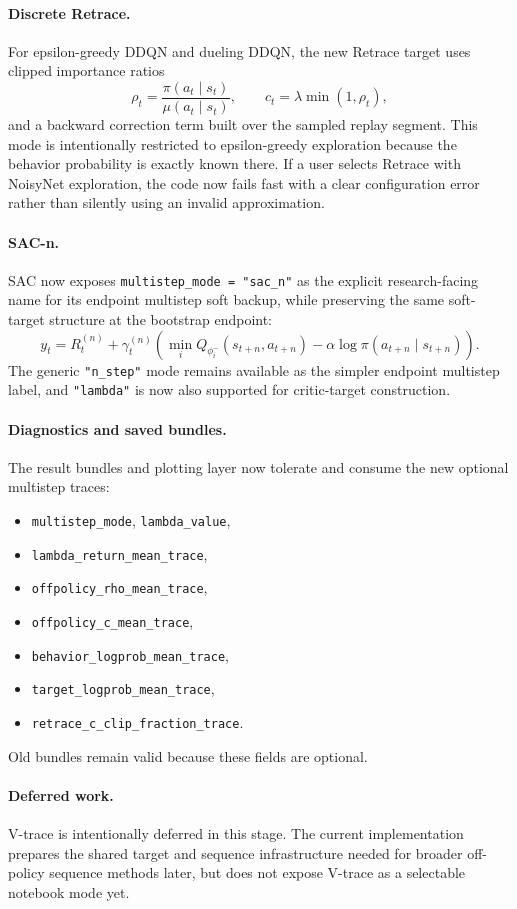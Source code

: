 \paragraph{Discrete Retrace.}
For epsilon-greedy DDQN and dueling DDQN, the new Retrace target uses clipped importance ratios
\[
\rho_t = \frac{\pi(a_t \mid s_t)}{\mu(a_t \mid s_t)},
\qquad
c_t = \lambda \min(1,\rho_t),
\]
and a backward correction term built over the sampled replay segment. This mode is intentionally restricted to epsilon-greedy exploration because the behavior probability is exactly known there. If a user selects Retrace with NoisyNet exploration, the code now fails fast with a clear configuration error rather than silently using an invalid approximation.

\paragraph{SAC-n.}
SAC now exposes \texttt{multistep\_mode = "sac\_n"} as the explicit research-facing name for its endpoint multistep soft backup, while preserving the same soft-target structure at the bootstrap endpoint:
\[
y_t = R_t^{(n)} + \gamma_t^{(n)}\left(\min_i Q_{\phi_i^-}(s_{t+n}, a_{t+n}) - \alpha \log \pi(a_{t+n}\mid s_{t+n})\right).
\]
The generic \texttt{"n\_step"} mode remains available as the simpler endpoint multistep label, and \texttt{"lambda"} is now also supported for critic-target construction.

\paragraph{Diagnostics and saved bundles.}
The result bundles and plotting layer now tolerate and consume the new optional multistep traces:
\begin{itemize}
  \item \texttt{multistep\_mode}, \texttt{lambda\_value},
  \item \texttt{lambda\_return\_mean\_trace},
  \item \texttt{offpolicy\_rho\_mean\_trace},
  \item \texttt{offpolicy\_c\_mean\_trace},
  \item \texttt{behavior\_logprob\_mean\_trace},
  \item \texttt{target\_logprob\_mean\_trace},
  \item \texttt{retrace\_c\_clip\_fraction\_trace}.
\end{itemize}
Old bundles remain valid because these fields are optional.

\paragraph{Deferred work.}
V-trace is intentionally deferred in this stage. The current implementation prepares the shared target and sequence infrastructure needed for broader off-policy sequence methods later, but does not expose V-trace as a selectable notebook mode yet.
